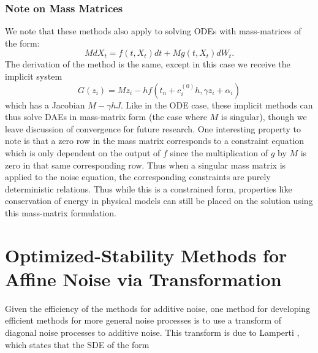 \documentclass{article}
\begin{document}
\subsubsection{Note on Mass Matrices}

We note that these methods also apply to solving ODEs with mass-matrices
of the form:
\[
MdX_{t}=f(t,X_{t})dt+Mg(t,X_{t})dW_{t}.
\]
The derivation of the method is the same, except in this case we
receive the implicit system
\[
G(z_{i})=Mz_{i}-hf\left(t_{n}+c_{i}^{(0)}h,\gamma z_{i}+\alpha_{i}\right)
\]
which has a Jacobian $M-\gamma hJ$. Like in the ODE case, these
implicit methods can thus solve DAEs in mass-matrix form (the case
where $M$ is singular), though we leave discussion of convergence
for future research. One interesting property to note is that a zero
row in the mass matrix corresponds to a constraint equation which
is only dependent on the output of $f$ since the multiplication of
$g$ by $M$ is zero in that same corresponding row. Thus when a singular
mass matrix is applied to the noise equation, the corresponding constraints
are purely deterministic relations. Thus while this is a constrained
form, properties like conservation of energy in physical models can
still be placed on the solution using this mass-matrix formulation.

\section{Optimized-Stability Methods for Affine Noise via Transformation \label{sec:Affine-Transformation}}

Given the efficiency of the methods for additive noise, one method
for developing efficient methods for more general noise processes
is to use a transform of diagonal noise processes to additive noise.
This transform is due to Lamperti \cite{RN3525}, which states that
the SDE of the form
\end{document}

